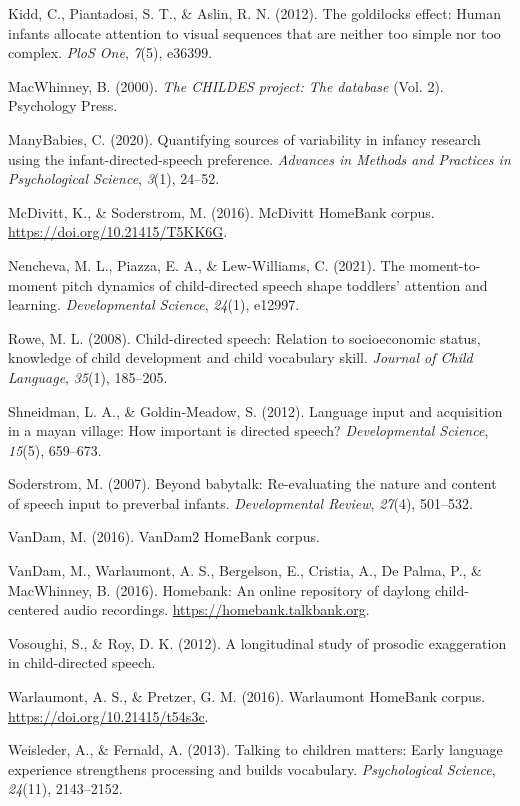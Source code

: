 \documentclass[10pt, letterpaper]{article}
\newenvironment{CSLReferences}%
  {}%
  {\par}
\begin{document}
\begin{CSLReferences}{1}{0}
\leavevmode\hypertarget{ref-kidd2012goldilocks}{}%
Kidd, C., Piantadosi, S. T., \& Aslin, R. N. (2012). The goldilocks
effect: Human infants allocate attention to visual sequences that are
neither too simple nor too complex. \emph{PloS One}, \emph{7}(5),
e36399.

\leavevmode\hypertarget{ref-macwhinney2000childes}{}%
MacWhinney, B. (2000). \emph{The CHILDES project: The database} (Vol.
2). Psychology Press.

\leavevmode\hypertarget{ref-manybabies2020quantifying}{}%
ManyBabies, C. (2020). Quantifying sources of variability in infancy
research using the infant-directed-speech preference. \emph{Advances in
Methods and Practices in Psychological Science}, \emph{3}(1), 24--52.

\leavevmode\hypertarget{ref-soderstromcorpus}{}%
McDivitt, K., \& Soderstrom, M. (2016). McDivitt HomeBank corpus.
\url{https://doi.org/10.21415/T5KK6G}.

\leavevmode\hypertarget{ref-nencheva2021moment}{}%
Nencheva, M. L., Piazza, E. A., \& Lew-Williams, C. (2021). The
moment-to-moment pitch dynamics of child-directed speech shape toddlers'
attention and learning. \emph{Developmental Science}, \emph{24}(1),
e12997.

\leavevmode\hypertarget{ref-rowe2008child}{}%
Rowe, M. L. (2008). Child-directed speech: Relation to socioeconomic
status, knowledge of child development and child vocabulary skill.
\emph{Journal of Child Language}, \emph{35}(1), 185--205.

\leavevmode\hypertarget{ref-shneidman2012language}{}%
Shneidman, L. A., \& Goldin-Meadow, S. (2012). Language input and
acquisition in a mayan village: How important is directed speech?
\emph{Developmental Science}, \emph{15}(5), 659--673.

\leavevmode\hypertarget{ref-soderstrom2007beyond}{}%
Soderstrom, M. (2007). Beyond babytalk: Re-evaluating the nature and
content of speech input to preverbal infants. \emph{Developmental
Review}, \emph{27}(4), 501--532.

\leavevmode\hypertarget{ref-vandamcorpus}{}%
VanDam, M. (2016). VanDam2 HomeBank corpus.

\leavevmode\hypertarget{ref-homebank}{}%
VanDam, M., Warlaumont, A. S., Bergelson, E., Cristia, A., De Palma, P.,
\& MacWhinney, B. (2016). Homebank: An online repository of daylong
child-centered audio recordings. \url{https://homebank.talkbank.org}.

\leavevmode\hypertarget{ref-vosoughi2012longitudinal}{}%
Vosoughi, S., \& Roy, D. K. (2012). A longitudinal study of prosodic
exaggeration in child-directed speech.

\leavevmode\hypertarget{ref-warlaumontcorpus}{}%
Warlaumont, A. S., \& Pretzer, G. M. (2016). Warlaumont HomeBank corpus.
\url{https://doi.org/10.21415/t54s3c}.

\leavevmode\hypertarget{ref-weisleder2013talking}{}%
Weisleder, A., \& Fernald, A. (2013). Talking to children matters: Early
language experience strengthens processing and builds vocabulary.
\emph{Psychological Science}, \emph{24}(11), 2143--2152.

\end{CSLReferences}


\end{document}
